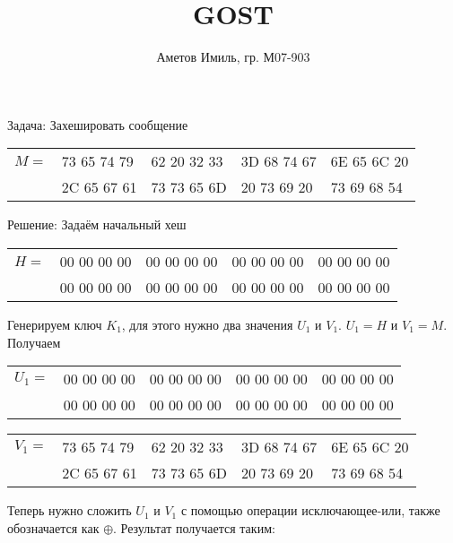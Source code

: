 \documentclass[10pt]{article}
\author{Аметов Имиль, гр. М07-903}
\title{GOST}
\begin{document}
\maketitle

Задача: Захешировать сообщение

\begin{center}
  \begin{tabular}{lllll}
    $M =$ & 73 65 74 79 & 62 20 32 33 & 3D 68 74 67 & 6E 65 6C 20 \\
          & 2C 65 67 61 & 73 73 65 6D & 20 73 69 20 & 73 69 68 54 \\
  \end{tabular}
\end{center}

Решение: Задаём начальный хеш

\begin{center}
  \begin{tabular}{lllll}
    $H =$ & 00 00 00 00 & 00 00 00 00 & 00 00 00 00 & 00 00 00 00 \\
          & 00 00 00 00 & 00 00 00 00 & 00 00 00 00 & 00 00 00 00 \\
  \end{tabular}
\end{center}

Генерируем ключ $K_1$, для этого нужно два значения $U_1$ и $V_1$. $U_1 = H$ и $V_1 = M$. Получаем

\begin{center}
  \begin{tabular}{lllll}
    $U_1 =$ & 00 00 00 00 & 00 00 00 00 & 00 00 00 00 & 00 00 00 00 \\
            & 00 00 00 00 & 00 00 00 00 & 00 00 00 00 & 00 00 00 00 \\
  \end{tabular}
\end{center}

\begin{center}
  \begin{tabular}{lllll}
    $V_1 =$ & 73 65 74 79 & 62 20 32 33 & 3D 68 74 67 & 6E 65 6C 20 \\
            & 2C 65 67 61 & 73 73 65 6D & 20 73 69 20 & 73 69 68 54 \\
  \end{tabular}
\end{center}

Теперь нужно сложить $U_1$ и $V_1$ с помощью операции исключающее-или, также обозначается как $\oplus$. Результат получается таким:
\end{document}
